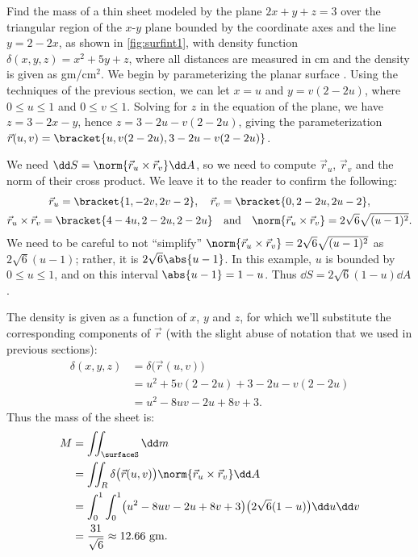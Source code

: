 \begin{example}\label{ex_surfint1}
Find the mass of a thin sheet modeled by the plane $2x+y+z=3$ over the triangular region of the $x$-$y$ plane bounded by the coordinate axes and the line $y=2-2x$, as shown in \autoref{fig:surfint1}, with density function $\delta(x,y,z) = x^2+5y+z$, where all distances are measured in cm and the density is given as gm/cm$^2$.
\solution
We begin by parameterizing the planar surface \surfaceS. Using the techniques of the previous section, we can let $x=u$ and $y=v(2-2u)$, where $0\leq u\leq 1$ and $0\leq v\leq 1$. Solving for $z$ in the equation of the plane, we have $z=3-2x-y$, hence $z = 3-2u-v(2-2u)$, giving the parameterization
$\vec r(u,v) =\bracket{u, v(2-2u), 3-2u-v(2-2u)}$.

We need $\dd S=\norm{\vec r_u\times \vec r_v}\dd A$, so we need to compute $\vec r_u$, $\vec r_v$ and the norm of their cross product. We leave it to the reader to confirm the following:
\begin{gather*}
\vec r_u =\bracket{1,-2v,2v-2},\quad \vec r_v =\bracket{0,2-2u, 2u-2},\\
\vec r_u\times \vec r_v =\bracket{4-4u,2-2u,2-2u}
\quad \text{and}\quad
\norm{\vec r_u\times \vec r_v} = 2\sqrt{6}\sqrt{(u-1)^2}.
\end{gather*}
We need to be careful to not ``simplify'' $\norm{\vec r_u\times \vec r_v} = 2\sqrt{6}\sqrt{(u-1)^2}$ as $2\sqrt{6}(u-1)$; rather, it is $2\sqrt{6}\abs{u-1}$. In this example, $u$ is bounded by $0\leq u\leq 1$, and on this interval $\abs{u-1}= 1-u$. Thus $\dd S = 2\sqrt{6}(1-u)\dd A$. 

The density is given as a function of $x$, $y$ and $z$, for which we'll substitute the corresponding components of $\vec r$ (with the slight abuse of notation that we used in previous sections): 
\begin{align*}
	\delta(x,y,z)
	&= \delta\bigl(\vec r(u,v)\bigr) \\
	&= u^2 + 5v(2-2u)+3-2u-v(2-2u)\\
	&= u^2-8uv-2u+8v+3.
\end{align*}
Thus the mass of the sheet is:
\begin{align*}
	M &= \iint_\surfaceS\dd m\\
	&= \iint_R \delta\bigl(\vec r(u,v)\bigr)\norm{\vec r_u\times \vec r_v}\dd A\\
	&= \int_0^1\int_0^1 \bigl(u^2-8uv-2u+8v+3\bigr)\bigl(2\sqrt{6}(1-u)\bigr)\dd u\dd v\\
	&= \frac{31}{\sqrt{6}} \approx 12.66 \text{ gm.}
\end{align*}
\end{example}

